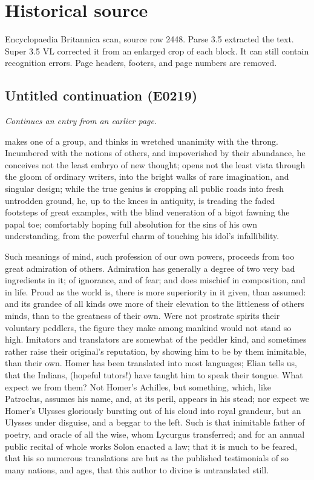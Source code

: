 \documentclass{article}
\begin{document}
\section*{Historical source}
Encyclopaedia Britannica scan, source row 2448. Parse 3.5 extracted the text. Super 3.5 VL corrected it from an enlarged crop of each block. It can still contain recognition errors.
Page headers, footers, and page numbers are removed.

\subsection*{Untitled continuation (E0219)}
\textit{Continues an entry from an earlier page.}

makes one of a group, and thinks in wretched unanimity with the throng. Incumbered with the notions of others, and impoverished by their abundance, he conceives not the least embryo of new thought; opens not the least vista through the gloom of ordinary writers, into the bright walks of rare imagination, and singular design; while the true genius is cropping all public roads into fresh untrodden ground, he, up to the knees in antiquity, is treading the faded footsteps of great examples, with the blind veneration of a bigot fawning the papal toe; comfortably hoping full absolution for the sins of his own understanding, from the powerful charm of touching his idol's infallibility.

Such meanings of mind, such profession of our own powers, proceeds from too great admiration of others. Admiration has generally a degree of two very bad ingredients in it; of ignorance, and of fear; and does mischief in composition, and in life. Proud as the world is, there is more superiority in it given, than assumed: and its grandee of all kinds owe more of their elevation to the littleness of others minds, than to the greatness of their own. Were not prostrate spirits their voluntary peddlers, the figure they make among mankind would not stand so high. Imitators and translators are somewhat of the peddler kind, and sometimes rather raise their original's reputation, by showing him to be by them inimitable, than their own. Homer has been translated into most languages; Elian tells us, that the Indians, (hopeful tutors!) have taught him to speak their tongue. What expect we from them? Not Homer's Achilles, but something, which, like Patroclus, assumes his name, and, at its peril, appears in his stead; nor expect we Homer's Ulysses gloriously bursting out of his cloud into royal grandeur, but an Ulysses under disguise, and a beggar to the left. Such is that inimitable father of poetry, and oracle of all the wise, whom Lycurgus transferred; and for an annual public recital of whole works Solon enacted a law; that it is much to be feared, that his so numerous translations are but as the published testimonials of so many nations, and ages, that this author to divine is untranslated still.
\end{document}
